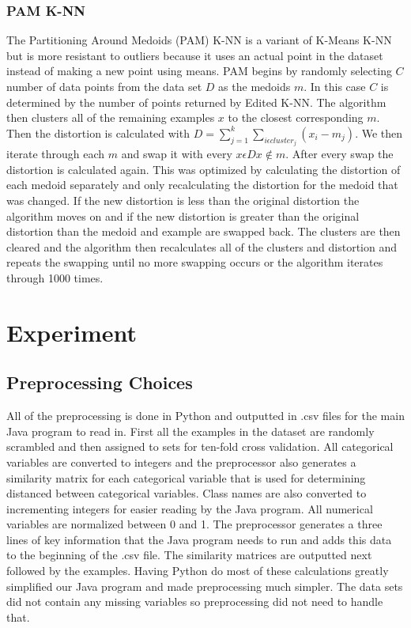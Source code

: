 \documentclass[twoside,11pt]{article}
\begin{document}
\subsubsection{PAM K-NN}
The Partitioning Around Medoids (PAM) K-NN is a variant of K-Means K-NN but is more resistant to outliers because it uses an actual point in the dataset instead of making a new point using means. PAM begins by randomly selecting $C$ number of data points from the data set $D$ as the medoids $m$. In this case $C$ is determined by the number of points returned by Edited K-NN. The algorithm then clusters all of the remaining examples $x$ to the closest corresponding $m$. Then the distortion is calculated with $D = \sum_{j=1}^{k}\sum_{i\epsilon cluster_j} (x_i - m_j)$. We then iterate through each $m$ and swap it with every $x \epsilon D x \notin m$. After every swap the distortion is calculated again. This was optimized by calculating the distortion of each medoid separately and only recalculating the distortion for the medoid that was changed. If the new distortion is less than the original distortion the algorithm moves on and if the new distortion is greater than the original distortion than the medoid and example are swapped back. The clusters are then cleared and the algorithm then recalculates all of the clusters and distortion and repeats the swapping until no more swapping occurs or the algorithm iterates through 1000 times. 

\section{Experiment}

\subsection{Preprocessing Choices}

All of the preprocessing is done in Python and outputted in .csv files for the main Java program to read in. First all the examples in the dataset are randomly scrambled and then assigned to sets for ten-fold cross validation. All categorical variables are converted to integers and the preprocessor also generates a similarity matrix for each categorical variable that is used for determining distanced between categorical variables. Class names are also converted to incrementing integers for easier reading by the Java program. All numerical variables are normalized between 0 and 1. The preprocessor generates a three lines of key information that the Java program needs to run and adds this data to the beginning of the .csv file. The similarity matrices are outputted next followed by the examples. Having Python do most of these calculations greatly simplified our Java program and made preprocessing much simpler. The data sets did not contain any missing variables so preprocessing did not need to handle that. 
\end{document}
